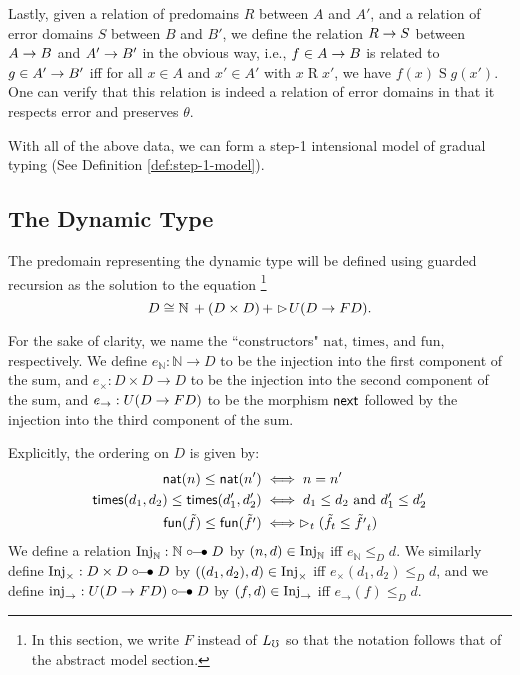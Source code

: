 Lastly, given a relation of predomains $R$ between $A$ and $A'$, and a relation
of error domains $S$ between $B$ and $B'$, we define the relation $R \to S$
between $A \to B$ and $A' \to B'$ in the obvious way, i.e., $f \in A \to B$
is related to $g \in A' \to B'$ iff for all $x \in A$ and $x' \in A'$ with
$x \mathrel{R} x'$, we have $f(x) \mathrel{S} g(x')$.
%
One can verify that this relation is indeed a relation of error domains
in that it respects error and preserves $\theta$.

With all of the above data, we can form a step-1 intensional model of gradual typing
(See Definition \ref{def:step-1-model}).

\subsection{The Dynamic Type}
The predomain representing the dynamic type will be defined using guarded recursion
as the solution to the equation
\footnote{In this section, we write $F$ instead of $L_\mho$ so that the notation follows that of the abstract model section.}
%
\[ D \cong \mathbb{N}\, + (D \times D)\, + \vartriangleright \hspace{-0.2em} U(D \to FD). \]
%

For the sake of clarity, we name the ``constructors" $\text{nat}$, $\text{times}$,
and $\text{fun}$, respectively.
%
We define $e_\mathbb{N} : \mathbb{N} \to D$ to be the injection into the first
component of the sum, and $e_\times : D \times D \to D$ to be the injection into
the second component of the sum, and $e_\to : U(D \to F D)$ to be the morphism
$\mathsf{next}$ followed by the injection into the third component of the sum.

Explicitly, the ordering on $D$ is given by:
%
\begin{align*}
    \mathsf{nat}(n) \le \mathsf{nat}(n') 
        &\iff n = n' \\
    \mathsf{times} (d_1, d_2) \le \mathsf{times} (d_1', d_2')
        &\iff d_1 \le d_2 \text{ and } d_1' \le d_2'\\
    \mathsf{fun}(\tilde{f}) \le \mathsf{fun}(\tilde{f'}) 
        &\iff \vartriangleright_t(\tilde{f}_t \le \tilde{f'}_t)
\end{align*}
%
We define a relation $\text{Inj}_\mathbb{N} : \mathbb{N} \mathrel{\circ\mkern-6mu-\mkern-6mu\bullet} D$ by
$(n, d) \in \text{Inj}_\mathbb{N}$ iff $e_\mathbb{N} \le_D d$.
We similarly define $\text{Inj}_\times : D \times D \mathrel{\circ\mkern-6mu-\mkern-6mu\bullet} D$ by
$((d_1, d_2), d) \in \text{Inj}_\times$ iff $e_\times(d_1, d_2) \le_D d$,
and we define $\text{inj}_\to : U(D \to F D) \mathrel{\circ\mkern-6mu-\mkern-6mu\bullet} D$ by
$(f, d) \in \text{Inj}_\to$ iff $e_\to(f) \le_D d$.


